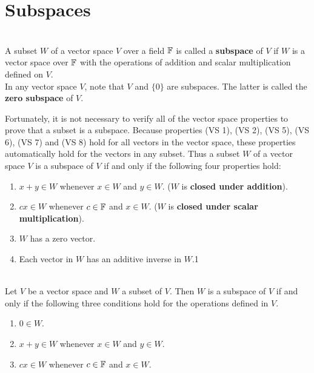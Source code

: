 \section{Subspaces}

\begin{definition}
	\hfill\\
	A subset $W$ of a vector space $V$ over a field $\mathbb{F}$ is called a \textbf{subspace} of $V$ if $W$ is a vector space over $\mathbb{F}$ with the operations of addition and scalar multiplication defined on $V$.\\

	In any vector space $V$, note that $V$ and $\{0\}$ are subspaces. The latter is called the \textbf{zero subspace} of $V$.

	Fortunately, it is not necessary to verify all of the vector space properties to prove that a subset is a subspace. Because properties (VS 1), (VS 2), (VS 5), (VS 6), (VS 7) and (VS 8) hold for all vectors in the vector space, these properties automatically hold for the vectors in any subset. Thus a subset $W$ of a vector space $V$ is a subspace of $V$ if and only if the following four properties hold:

	\begin{enumerate}
		\item $x + y \in W$ whenever $x \in W$ and $y \in W$. ($W$ is \textbf{closed under addition}).
		\item $cx \in W$ whenever $c \in \mathbb{F}$ and $x \in W$. ($W$ is \textbf{closed under scalar multiplication}).
		\item $W$ has a zero vector.
		\item Each vector in $W$ has an additive inverse in $W$.1
	\end{enumerate}
\end{definition}

\begin{theorem}
	\hfill\\
	Let $V$ be a vector space and $W$ a subset of $V$. Then $W$ is a subspace of $V$ if and only if the following three conditions hold for the operations defined in $V$.

	\begin{enumerate}
		\item $0 \in W$.
		\item $x + y \in W$ whenever $x \in W$ and $y \in W$.
		\item $cx \in W$ whenever $c \in \mathbb{F}$ and $x \in W$.
	\end{enumerate}
\end{theorem}

